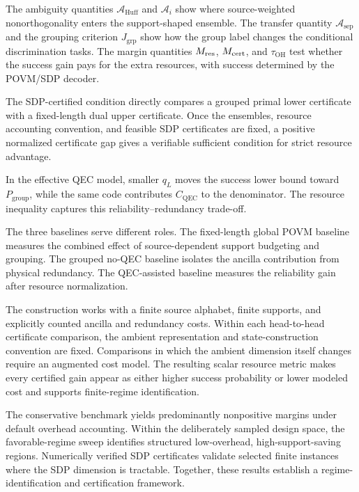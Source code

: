 \documentclass[
 reprint,
 amsmath,amssymb,
 aps,
 pra,
 floatfix,
]{revtex4-2}
\begin{document}
The ambiguity quantities \(\mathcal A_{\mathrm{Huff}}\) and \(\mathcal A_i\) show where source-weighted nonorthogonality enters the support-shaped ensemble. The transfer quantity \(\mathcal A_{\mathrm{sep}}\) and the grouping criterion \(J_{\mathrm{grp}}\) show how the group label changes the conditional discrimination tasks. The margin quantities \(M_{\rm res}\), \(M_{\rm cert}\), and \(\tau_{\mathrm{OH}}\) test whether the success gain pays for the extra resources, with success determined by the POVM/SDP decoder.

The SDP-certified condition directly compares a grouped primal lower certificate with a fixed-length dual upper certificate. Once the ensembles, resource accounting convention, and feasible SDP certificates are fixed, a positive normalized certificate gap gives a verifiable sufficient condition for strict resource advantage.

In the effective QEC model, smaller $q_L$ moves the success lower bound toward $P_{\mathrm{group}}$, while the same code contributes $C_{\mathrm{QEC}}$ to the denominator. The resource inequality captures this reliability--redundancy trade-off.

The three baselines serve different roles. The fixed-length global POVM baseline measures the combined effect of source-dependent support budgeting and grouping. The grouped no-QEC baseline isolates the ancilla contribution from physical redundancy. The QEC-assisted baseline measures the reliability gain after resource normalization.

The construction works with a finite source alphabet, finite supports, and explicitly counted ancilla and redundancy costs. Within each head-to-head certificate comparison, the ambient representation and state-construction convention are fixed. Comparisons in which the ambient dimension itself changes require an augmented cost model. The resulting scalar resource metric makes every certified gain appear as either higher success probability or lower modeled cost and supports finite-regime identification.

The conservative benchmark yields predominantly nonpositive margins under default overhead accounting. Within the deliberately sampled design space, the favorable-regime sweep identifies structured low-overhead, high-support-saving regions. Numerically verified SDP certificates validate selected finite instances where the SDP dimension is tractable. Together, these results establish a regime-identification and certification framework.
\end{document}
